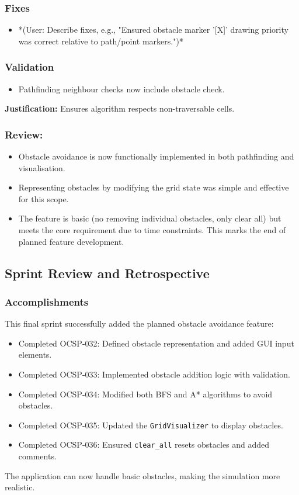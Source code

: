 \subsubsection{Fixes}
\begin{itemize}
	\item *(User: Describe fixes, e.g., "Ensured obstacle marker '[X]' drawing priority was correct relative to path/point markers.")*
\end{itemize}

\subsubsection{Validation}
\begin{itemize}
	\item Pathfinding neighbour checks now include obstacle check.
\end{itemize}
\textbf{Justification:} Ensures algorithm respects non-traversable cells.

\subsubsection{Review:}
\begin{itemize}
	\item Obstacle avoidance is now functionally implemented in both pathfinding and visualisation.
	\item Representing obstacles by modifying the grid state was simple and effective for this scope.
	\item The feature is basic (no removing individual obstacles, only clear all) but meets the core requirement due to time constraints. This marks the end of planned feature development.
\end{itemize}

\clearpage
\subsection{Sprint Review and Retrospective}

\subsubsection{Accomplishments}
This final sprint successfully added the planned obstacle avoidance feature:
\begin{itemize}
	\item Completed OCSP-032: Defined obstacle representation and added GUI input elements.
	\item Completed OCSP-033: Implemented obstacle addition logic with validation.
	\item Completed OCSP-034: Modified both BFS and A* algorithms to avoid obstacles.
	\item Completed OCSP-035: Updated the \verb|GridVisualizer| to display obstacles.
	\item Completed OCSP-036: Ensured \verb|clear_all| resets obstacles and added comments.
\end{itemize}
The application can now handle basic obstacles, making the simulation more realistic.

